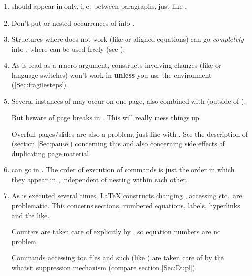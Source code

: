 \documentclass[12pt]{scrartcl}
\let\newslide=\relax
\begin{document}
  \begin{enumerate}
  \item {} should appear in  only, i.\,e.\ between paragraphs, just like
    .

  \item Don't put  or nested occurrences of  into .

  \item Structures where  does not work (like  or aligned equations) can go
    \emph{completely} into , where  can be used freely (see ).

  \item As  is read as a macro argument, constructs involving  changes (like
     or language switches) won't work in  \textbf{unless} you use the
     environment (\ref{Sec:fragilesteps}).

\newslide

  \item Several instances of  may occur on one page, also combined with  (outside
    of ).

    But beware of page breaks in . This will really mess things up.

    Overfull pages/slides are also a problem, just like with . See the description of 
    (section \ref{Sec:pause}) concerning this and also concerning side effects of duplicating page material.

  \item {} can go in . The order of execution of  commands is just the
    order in which they appear in , independent of nesting within each other.

    \newslide

  \item As  is executed several times, \LaTeX{} constructs changing , accessing
     etc.\ are problematic. This concerns sections, numbered equations, labels, hyperlinks and the like.

    Counters are taken care of explicitly by , so equation numbers are no problem.

    Commands accessing toc files and such (like ) are taken care of by the whatsit suppression
    mechanism (compare section \ref{Sec:Dupl}).
  \end{enumerate}
\end{document}
